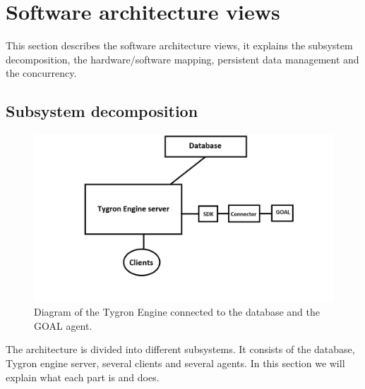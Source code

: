 \section{Software architecture views}
This section describes the software architecture views, it explains the subsystem decomposition, the hardware/software mapping, persistent data management and the concurrency.
\subsection{Subsystem decomposition}


\begin{figure}[h!]
  \centering
  \includegraphics[scale=0.55]{Tygrondatabase3.png}
  \caption{Diagram of the Tygron Engine connected to the database and the GOAL agent.}
  \label{fig:tygron1}
\end{figure}
The architecture is divided into different subsystems. It consists of the database, Tygron engine server, several clients and several agents. In this section we will explain what each part is and does.

